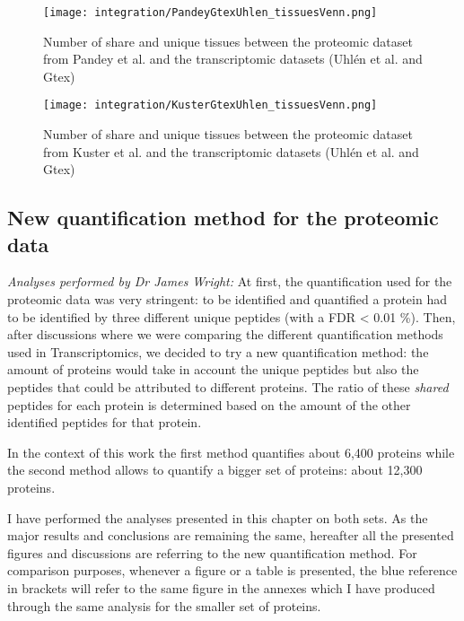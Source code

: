 \begin{figure}
    \texttt{[image: integration/PandeyGtexUhlen\_tissuesVenn.png]}\centering
    \caption{\label{VennTissuePandeyGtexUhlen}Number of share and unique
    tissues between the proteomic dataset
    from Pandey et al. and the transcriptomic datasets (Uhlén et al. and Gtex)}
\end{figure}



\begin{figure}
    \texttt{[image: integration/KusterGtexUhlen\_tissuesVenn.png]}\centering
    \caption{\label{VennTissueKusterGtexUhlen}Number of share and unique
    tissues between the proteomic dataset
    from Kuster et al. and the transcriptomic datasets (Uhlén et al. and Gtex)}
\end{figure}


\subsection{New quantification method for the proteomic data}
\label{subsec:newMethQuant}
\textit{Analyses performed by Dr James Wright:}
At first, the quantification used for the proteomic data was very stringent:
to be identified and quantified a protein had to be identified by three
different unique peptides (with a FDR < 0.01 \%). Then, after discussions where
we were comparing the different quantification methods used in Transcriptomics,
we decided to try a new quantification method: the amount of proteins would take
in account the unique peptides but also the peptides that could be attributed to
different proteins. The ratio of these \emph{shared} peptides for each protein
is determined based on the amount of the other identified peptides for that protein.

In the context of this work the first method quantifies about 6,400 proteins while
the second method allows to quantify a bigger set of proteins: about 12,300 proteins.

I have performed the analyses presented in this chapter on both sets. As the major
results and conclusions are remaining the same, hereafter all the presented figures
and discussions are referring to the new quantification method. For comparison
purposes, whenever a figure or a table is presented, the blue reference in brackets
will refer to the same figure in the annexes which I have produced through the
same analysis for the smaller set of proteins.


